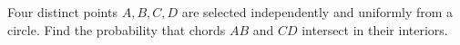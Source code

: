 Four distinct points $A,B,C,D$ are selected independently and uniformly from a circle. Find the probability that chords $AB$ and $CD$ intersect in their interiors.
